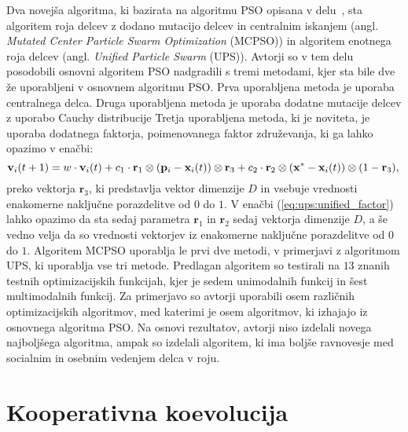 Dva novejša algoritma, ki bazirata na algoritmu PSO opisana v delu~\cite{alg:mcupso}, sta algoritem roja delcev z dodano mutacijo delcev in centralnim iskanjem (angl. \textit{Mutated Center Particle Swarm Optimization} (MCPSO)) in algoritem enotnega roja delcev (angl. \textit{Unified Particle Swarm} (UPS)).
Avtorji so v tem delu posodobili osnovni algoritem PSO nadgradili s tremi metodami, kjer sta bile dve že uporabljeni v osnovnem algoritmu PSO.
Prva uporabljena metoda je uporaba centralnega delca.
Druga uporabljena metoda je uporaba dodatne mutacije delcev z uporabo Cauchy distribucije
Tretja uporabljena metoda, ki je noviteta, je uporaba dodatnega faktorja, poimenovanega faktor združevanja, ki ga lahko opazimo v enačbi:
\begin{equation}
    \mathbf{v}_i(t + 1) = w \cdot \mathbf{v}_i(t) + c_1 \cdot \mathbf{r}_1 \otimes (\mathbf{p}_i - \mathbf{x}_i(t)) \otimes \mathbf{r}_3 + c_2 \cdot \mathbf{r}_2 \otimes (\mathbf{x}^* - \mathbf{x}_i(t)) \otimes (1 - \mathbf{r}_3), \label{eq:ups:unified_factor} \\
\end{equation}
preko vektorja $\mathbf{r}_3$, ki predstavlja vektor dimenzije $\mathit{D}$ in vsebuje vrednosti enakomerne naključne porazdelitve od $0$ do $1$.
V enačbi (\ref{eq:ups:unified_factor}) lahko opazimo da sta sedaj parametra $\mathbf{r}_1$ in $\mathbf{r}_2$ sedaj vektorja dimenzije $\mathit{D}$, a še vedno velja da so vrednosti vektorjev iz enakomerne naključne porazdelitve od $0$ do $1$.
Algoritem MCPSO uporablja le prvi dve metodi, v primerjavi z algoritmom UPS, ki uporablja vse tri metode.
Predlagan algoritem so testirali na $13$ znanih testnih optimizacijskih funkcijah, kjer je sedem unimodalnih funkcij in šest multimodalnih funkcij.
Za primerjavo so avtorji uporabili osem različnih optimizacijskih algoritmov, med katerimi je osem algoritmov, ki izhajajo iz osnovnega algoritma PSO.
Na osnovi rezultatov, avtorji niso izdelali novega najboljšega algoritma, ampak so izdelali algoritem, ki ima boljše ravnovesje med socialnim in osebnim vedenjem delca v roju.

\section{Kooperativna koevolucija}

